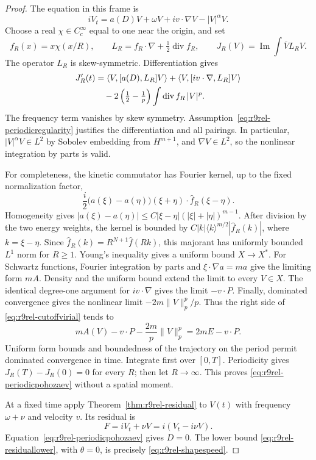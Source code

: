 \begin{proof}
The equation in this frame is
\[
 iV_t=a(D)V+\omega V+iv\cdot\nabla V-|V|^\alpha V.
\]
Choose a real $\chi\in C_c^\infty$ equal to one near the origin,
and set
\[
 f_R(x)=x\chi(x/R),\qquad
 L_R=f_R\cdot\nabla+\tfrac12\operatorname{div}f_R,
 \qquad J_R(V)=\operatorname{Im}\int\overline V L_RV.
\]
The operator $L_R$ is skew-symmetric. Differentiation gives
\begin{align}
 J_R'(t)
 &=\langle V,[a(D),L_R]V\rangle
 +\langle V,[iv\cdot\nabla,L_R]V\rangle\notag\\
 &\quad-2\left(\tfrac12-\tfrac1p\right)
 \int\operatorname{div}f_R\,|V|^p.
 \label{eq:r9rel-cutoffvirial}
\end{align}
The frequency term vanishes by skew symmetry.
Assumption~\eqref{eq:r9rel-periodicregularity} justifies the
differentiation and all pairings. In particular,
$|V|^\alpha V\in L^2$ by Sobolev embedding from $H^{m+1}$,
and $\nabla V\in L^2$, so the nonlinear integration by parts is valid.

For completeness, the kinetic commutator has Fourier kernel,
up to the fixed normalization factor,
\[
 \frac i2\bigl(a(\xi)-a(\eta)\bigr)
 (\xi+\eta)\cdot\widehat f_R(\xi-\eta).
\]
Homogeneity gives
$|a(\xi)-a(\eta)|\le C|\xi-\eta|(|\xi|+|\eta|)^{m-1}$.
After division by the two energy weights, the kernel is bounded
by $C|k|\langle k\rangle^{m/2}|\widehat f_R(k)|$,
where $k=\xi-\eta$. Since
$\widehat f_R(k)=R^{N+1}\widehat f(Rk)$, this majorant has
uniformly bounded $L^1$ norm for $R\ge1$.
Young's inequality gives a uniform bound $X\to X^*$.
For Schwartz functions, Fourier integration by parts and
$\xi\cdot\nabla a=ma$ give the limiting form $mA$.
Density and the uniform bound extend the limit to every $V\in X$.
The identical degree-one argument for $iv\cdot\nabla$ gives
the limit $-v\cdot P$. Finally, dominated convergence gives the
nonlinear limit $-2m\|V\|_p^p/p$.
Thus the right side of \eqref{eq:r9rel-cutoffvirial} tends to
\[
 mA(V)-v\cdot P-\frac{2m}{p}\|V\|_p^p
 =2mE-v\cdot P.
\]
Uniform form bounds and boundedness of the trajectory on the period
permit dominated convergence in time. Integrate first over
$[0,T]$. Periodicity gives $J_R(T)-J_R(0)=0$ for every $R$;
then let $R\to\infty$. This proves
\eqref{eq:r9rel-periodicpohozaev} without a spatial moment.

At a fixed time apply Theorem~\ref{thm:r9rel-residual} to $V(t)$
with frequency $\omega+\nu$ and velocity $v$.
Its residual is
\[
 F=iV_t+\nu V=i(V_t-i\nu V).
\]
Equation~\eqref{eq:r9rel-periodicpohozaev} gives $D=0$.
The lower bound \eqref{eq:r9rel-residuallower}, with $\theta=0$,
is precisely \eqref{eq:r9rel-shapespeed}.
\end{proof}


